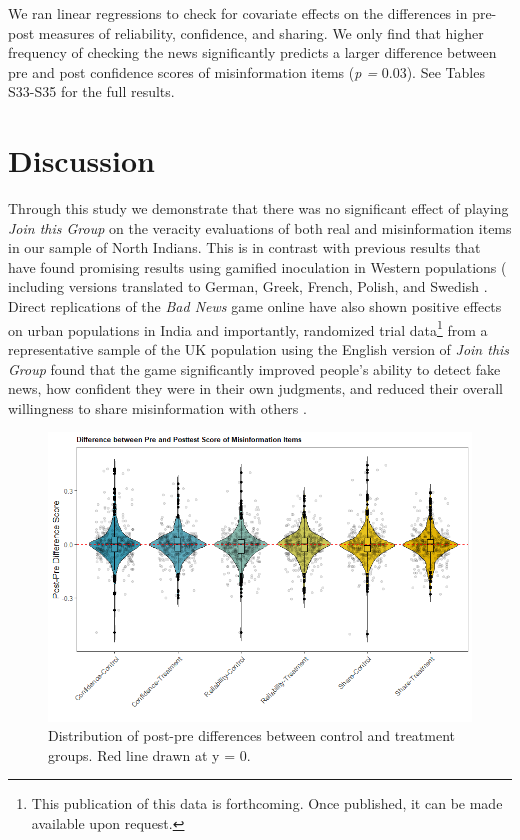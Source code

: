 \documentclass[empirical, authordate]{jote-new-article}
\begin{document}
We ran linear regressions to check for covariate effects on the differences in pre-post measures of reliability, confidence, and sharing. We only find that higher frequency of checking the news significantly predicts a larger difference between pre and post confidence scores of misinformation items (\emph{p = }0.03). See Tables S33-S35 for the full results.


\section{Discussion}

Through this study we demonstrate that there was no significant effect of playing \emph{Join this Group }on the veracity evaluations of both real and misinformation items in our sample of North Indians. This is in contrast with previous results that have found promising results using gamified inoculation in Western populations ( including versions translated to German, Greek, French, Polish, and Swedish \parencite{Basol2021, Roozenbeek2020}. Direct replications of the \emph{Bad News} game online have also shown positive effects on urban populations in India \parencite{Iyengar2022} and importantly, randomized trial data\footnote{ This publication of this data is forthcoming. Once published, it can be made available upon request.} from a representative sample of the UK population using the English version of \emph{Join this Group} found that the game significantly improved people's ability to detect fake news, how confident they were in their own judgments, and reduced their overall willingness to share misinformation with others \parencite{Basol2022}.

\begin{figure}[t]

  \begin{fullwidth}
    \includegraphics[width=\linewidth]{media/image6.jpeg}
    \caption{Distribution of post-pre differences between control and treatment groups. Red line drawn at y = 0.}
    \label{fig:figure6}
  \end{fullwidth}


\end{figure}
\end{document}
